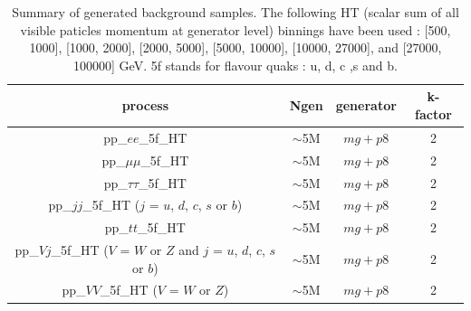 \begin{table}[!htb]\centering
\begin{tabular}{|c|c|c|c|}
\hline
\hline		
process & Ngen & generator & k-factor \\
\hline		
pp\_$ee$\_5f\_HT & $\sim$5M & $mg+p8$ & 2 \\
pp\_$\mu\mu$\_5f\_HT & $\sim$5M & $mg+p8$ & 2 \\
pp\_$\tau\tau$\_5f\_HT & $\sim$5M & $mg+p8$ & 2 \\
pp\_$jj$\_5f\_HT ($j$ = $u$, $d$, $c$, $s$ or $b$) & $\sim$5M & $mg+p8$ & 2 \\
pp\_$tt$\_5f\_HT & $\sim$5M & $mg+p8$ & 2 \\
pp\_$Vj$\_5f\_HT ($V$ = $W$ or $Z$ and $j$ = $u$, $d$, $c$, $s$ or $b$) & $\sim$5M & $mg+p8$ & 2 \\
pp\_$VV$\_5f\_HT ($V$ = $W$ or $Z$) & $\sim$5M & $mg+p8$ & 2 \\
\hline
\hline
\end{tabular}
\caption{Summary of generated background samples. The following HT (scalar sum of all visible paticles momentum at generator level) binnings have been used : [500, 1000], [1000, 2000], [2000, 5000], [5000, 10000], [10000, 27000], and [27000, 100000] GeV. 5f stands for flavour quaks : u, d, c ,s  and b.}
\label{tab:MCtable_bkgd}
\end{table}

